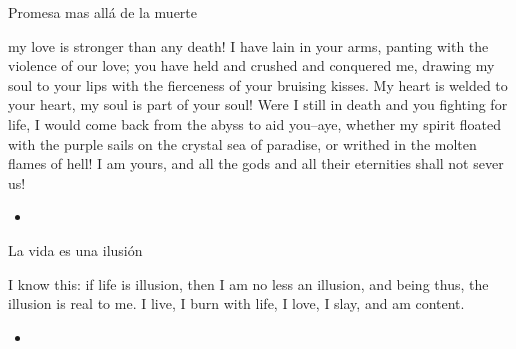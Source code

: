\begin{frame}{Promesa mas allá de la muerte}
	\begin{exampleblock}{}
		my love is stronger than any death! I have lain in your arms, panting with the violence of our love; you have held and crushed and conquered me, drawing my soul to your lips with the fierceness of your bruising kisses. My heart is welded to your heart, my soul is part of your soul! Were I still in death and you fighting for life, I would come back from the abyss to aid you–aye, whether my spirit floated with the purple sails on the crystal sea of paradise, or writhed in the molten flames of hell! I am yours, and all the gods and all their eternities shall not sever us!
	\end{exampleblock}

	\begin{itemize}
		\item \textit{  }
	\end{itemize}
\end{frame}
\note[itemize]{
	\item
}

\begin{frame}{La vida es una ilusión}
	\begin{exampleblock}{}
		 I know this: if life is illusion, then I am no less an illusion, and being thus, the illusion is real to me. I live, I burn with life, I love, I slay, and am content.
	\end{exampleblock}

	\begin{itemize}
		\item \textit{  }
	\end{itemize}
\end{frame}
\note[itemize]{
	\item
}

